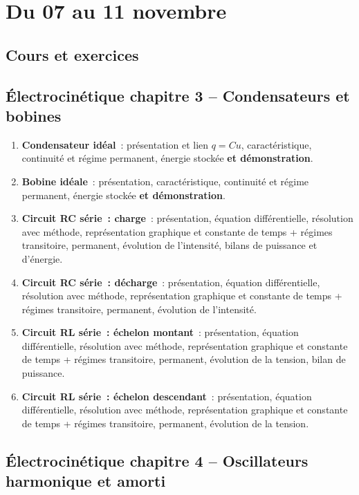 \documentclass[a4paper, 12pt, final, garamond]{book}
\begin{document}
\setcounter{chapter}{6}

\chapter{Du 07 au 11 novembre}

\section{Cours et exercices}

\section*{Électrocinétique chapitre 3 -- Condensateurs et bobines}
\begin{enumerate}[label=\Roman*]
    \item \textbf{Condensateur idéal}~: présentation et lien $q=Cu$,
        caractéristique, continuité et régime permanent, énergie stockée
        \textbf{et démonstration}.
    \item \textbf{Bobine idéale}~: présentation, caractéristique, continuité et
        régime permanent, énergie stockée \textbf{et démonstration}.
    \item \textbf{Circuit RC série~: charge}~: présentation, équation
        différentielle, résolution avec méthode, représentation graphique et
        constante de temps + régimes transitoire, permanent, évolution de
        l'intensité, bilans de puissance et d'énergie.
    \item \textbf{Circuit RC série~: décharge}~: présentation, équation
        différentielle, résolution avec méthode, représentation graphique et
        constante de temps + régimes transitoire, permanent, évolution de
        l'intensité.
    \item \textbf{Circuit RL série~: échelon montant}~: présentation, équation
        différentielle, résolution avec méthode, représentation graphique et
        constante de temps + régimes transitoire, permanent, évolution de
        la tension, bilan de puissance.
    \item \textbf{Circuit RL série~: échelon descendant}~: présentation, équation
        différentielle, résolution avec méthode, représentation graphique et
        constante de temps + régimes transitoire, permanent, évolution de
        la tension.
\end{enumerate}

\section*{Électrocinétique chapitre 4 -- Oscillateurs harmonique et amorti}
\end{document}
